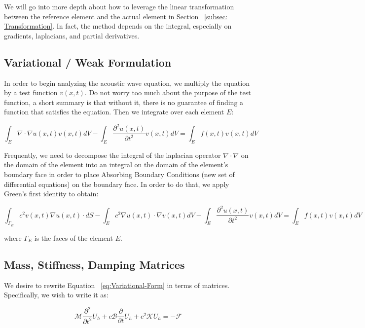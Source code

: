 We will go into more depth about how to leverage the linear transformation between the reference element and the actual element in Section ~\ref{subsec: Transformation}. In fact, the method depends on the integral, especially on gradients, laplacians, and partial derivatives.

\subsection{Variational / Weak Formulation}

In order to begin analyzing the acoustic wave equation, we multiply the equation by a test function $v(x,t)$. Do not worry too much about the purpose of the test function, a short summary is that without it, there is no guarantee of finding a function that satisfies the equation. Then we integrate over each element $E$:

\begin{equation} 
\int_E \nabla \cdot \nabla u(x,t) v(x,t) dV - \int_E \frac{\partial^2 u(x,t)}{\partial t^2} v(x,t) dV = \int_E f(x,t) v(x,t) dV 
\end{equation}

Frequently, we need to decompose the integral of the laplacian operator $\nabla \cdot \nabla$ on the domain of the element into an integral on the domain of the element's boundary face in order to place Absorbing Boundary Conditions (new set of differential equations) on the boundary face. In order to do that, we apply Green's first identity to obtain:

\begin{equation}
\int_{\Gamma_E} c^2 v(x,t) \nabla u(x,t) \cdot dS - \int_E c^2 \nabla u(x,t) \cdot \nabla v(x,t) dV - \int_E \frac{\partial^2 u(x,t)}{\partial t^2} v(x,t) dV = \int_E f(x,t) v(x,t) dV
\label{eq:Variational-Form}
\end{equation}

where $\Gamma_E$ is the faces of the element $E$.

\subsection{Mass, Stiffness, Damping Matrices}

We desire to rewrite Equation ~\ref{eq:Variational-Form} in terms of matrices. Specifically, we wish to write it as:

\begin{equation}
\mathcal{M} \frac{\partial^2}{\partial t^2} U_h + c \mathcal{B} \frac{\partial}{\partial t} U_h + c^2 \mathcal{K} U_h = -\mathcal{F}
\label{eq:Matrix-Form}
\end{equation}


